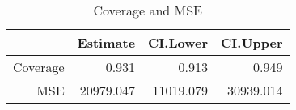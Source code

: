 \begin{table}[ht]
\centering
\caption{Coverage and MSE} 
\begin{tabular}{rrrr}
  \hline
 & Estimate & CI.Lower & CI.Upper \\ 
  \hline
Coverage & 0.931 & 0.913 & 0.949 \\ 
  MSE & 20979.047 & 11019.079 & 30939.014 \\ 
   \hline
\end{tabular}
\end{table}
